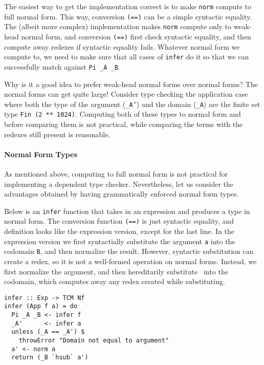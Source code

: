 \documentclass[preprint,authoryear]{sigplanconf}
\begin{document}
The easiest way to get the implementation correct is to make
\texttt{norm} compute to full normal form. This way,
conversion \texttt{(==)} can be a simple syntactic equality. The
(albeit more complex) implementation makes \texttt{norm} compute only
to weak-head normal form, and conversion \texttt{(==)} first check
syntactic equality, and then compute away redexes if syntactic
equality fails. Whatever normal form we compute to, we need to make
sure that all cases of \texttt{infer} do it so that we can
successfully match against \texttt{Pi \_A \_B}.

Why is it a good idea to prefer weak-head normal forms over normal
forms? The normal forms can get quite large! Consider type checking
the application case where both the type of the argument (\texttt{\_A'})
and the domain (\texttt{\_A}) are the finite set type
\texttt{Fin (2 ** 1024)}. Computing both of these types to normal form
and before comparing them is not practical, while comparing the
terms with the redexes still present is reasonable.

\paragraph{Normal Form Types}

As mentioned above, computing to full normal form is not practical for
implementing a dependent type checker. Nevertheless, let us consider
the advantages obtained by having grammatically enforced normal form
types.

Below is an \texttt{infer} function that takes in an expression
and produces a type in normal form. The conversion function
\texttt{(==)} is just syntactic equality, and definition looks like
the expression version, except for the last line. In the expression
version we first syntactially substitute the argument \texttt{a} into
the codomain \texttt{B}, and then normalize the result. However,
syntactic substitution can create a redex, so it is not a well-formed
operation on normal forms. Instead, we first normalize the argument,
and then hereditarily substitute~\cite{TODO} into the codomain, which
computes away any redex created while substituting.

\begin{verbatim}
infer :: Exp -> TCM Nf
infer (App f a) = do
  Pi _A _B <- infer f
  _A'      <- infer a
  unless (_A == _A') $
    throwError "Domain not equal to argument"
  a' <- norm a
  return (_B `hsub` a')
\end{verbatim}
\end{document}
